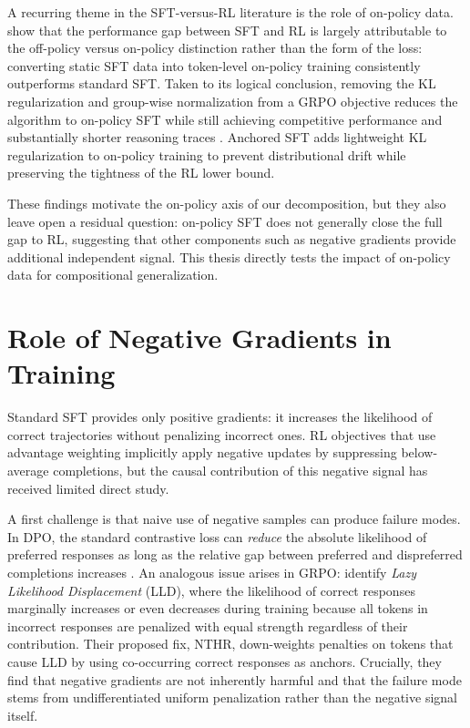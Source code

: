 \documentclass[12pt]{cmuthesis}
\begin{document}
A recurring theme in the SFT-versus-RL literature is the role of on-policy data.
\citet{mingOneTokenRolloutGuiding2026} show that the performance gap between SFT and RL is largely attributable to the off-policy versus on-policy distinction rather than the form of the loss: converting static SFT data into token-level on-policy training consistently outperforms standard SFT.
Taken to its logical conclusion, removing the KL regularization and group-wise normalization from a GRPO objective reduces the algorithm to on-policy SFT while still achieving competitive performance and substantially shorter reasoning traces \citep{zhaoOnPolicySupervisedFineTuning2026}.
Anchored SFT \citep{zhuAnchoredSupervisedFineTuning2026} adds lightweight KL regularization to on-policy training to prevent distributional drift while preserving the tightness of the RL lower bound.

These findings motivate the on-policy axis of our decomposition, but they also leave open a residual question: on-policy SFT does not generally close the full gap to RL, suggesting that other components such as negative gradients provide additional independent signal.
This thesis directly tests the impact of on-policy data for compositional generalization.

\section{Role of Negative Gradients in Training}

Standard SFT provides only positive gradients: it increases the likelihood of correct trajectories without penalizing incorrect ones.
RL objectives that use advantage weighting implicitly apply negative updates by suppressing below-average completions, but the causal contribution of this negative signal has received limited direct study.

A first challenge is that naive use of negative samples can produce failure modes. In DPO, the standard contrastive loss can \emph{reduce} the absolute likelihood of preferred responses as long as the relative gap between preferred and dispreferred completions increases \citep{pal_smaug_2024}. 
An analogous issue arises in GRPO: \citet{deng_effect_2025} identify \emph{Lazy Likelihood Displacement} (LLD), where the likelihood of correct responses marginally increases or even decreases during training because all tokens in incorrect responses are penalized with equal strength regardless of their contribution.
Their proposed fix, NTHR, down-weights penalties on tokens that cause LLD by using co-occurring correct responses as anchors.
Crucially, they find that negative gradients are not inherently harmful and that the failure mode stems from undifferentiated uniform penalization rather than the negative signal itself.
\end{document}
